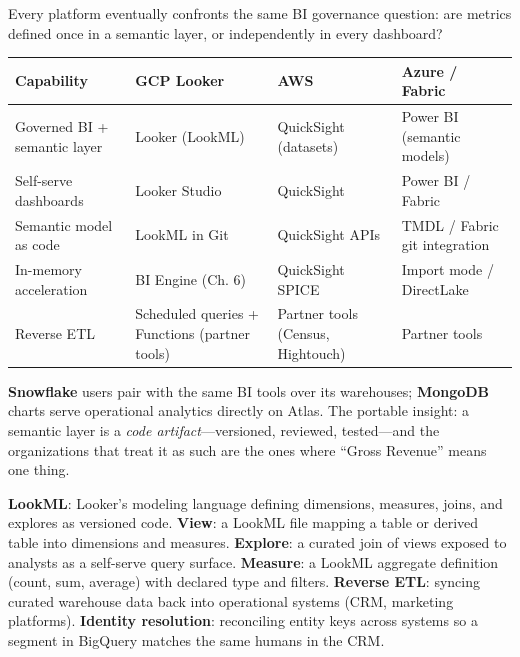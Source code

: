 \begin{crosscloud}
Every platform eventually confronts the same BI governance question: are metrics defined once in a semantic layer, or independently in every dashboard?

\vspace{2mm}
{\footnotesize
\begin{tabular}{@{}p{2.8cm}p{3.0cm}p{3.0cm}p{3.0cm}@{}} \\
\toprule
\textbf{Capability} & \textbf{GCP Looker} & \textbf{AWS} & \textbf{Azure / Fabric} \\
\midrule
Governed BI + semantic layer & Looker (LookML) & QuickSight (datasets) & Power BI (semantic models) \\
Self-serve dashboards & Looker Studio & QuickSight & Power BI / Fabric \\
Semantic model as code & LookML in Git & QuickSight APIs & TMDL / Fabric git integration \\
In-memory acceleration & BI Engine (Ch. 6) & QuickSight SPICE & Import mode / DirectLake \\
Reverse ETL & Scheduled queries + Functions (partner tools) & Partner tools (Census, Hightouch) & Partner tools \\
\bottomrule
\end{tabular}}

\vspace{1mm}
\textbf{Snowflake} users pair with the same BI tools over its warehouses; \textbf{MongoDB} charts serve operational analytics directly on Atlas. The portable insight: a semantic layer is a \emph{code artifact}---versioned, reviewed, tested---and the organizations that treat it as such are the ones where ``Gross Revenue'' means one thing.
\end{crosscloud}

\begin{keyterms}
\textbf{LookML}: Looker's modeling language defining dimensions, measures, joins, and explores as versioned code.
\textbf{View}: a LookML file mapping a table or derived table into dimensions and measures.
\textbf{Explore}: a curated join of views exposed to analysts as a self-serve query surface.
\textbf{Measure}: a LookML aggregate definition (count, sum, average) with declared type and filters.
\textbf{Reverse ETL}: syncing curated warehouse data back into operational systems (CRM, marketing platforms).
\textbf{Identity resolution}: reconciling entity keys across systems so a segment in BigQuery matches the same humans in the CRM.
\end{keyterms}

